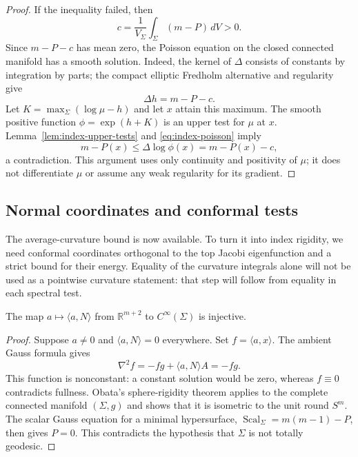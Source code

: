 \begin{proof}
If the inequality failed, then
\[
 c=\frac{1}{V_\Sigma}\int_\Sigma(m-P)\,dV>0.
\]
Since $m-P-c$ has mean zero, the Poisson equation on the closed connected
manifold has a smooth solution. Indeed, the kernel of $\Delta$ consists
of constants by integration by parts; the compact elliptic Fredholm
alternative and regularity
\cite[\S10, equations~(10.4)--(10.6)]{TaylorEllipticNotes} give
\begin{equation}\label{eq:index-poisson}
 \Delta h=m-P-c.
\end{equation}
Let $K=\max_\Sigma(\log\mu-h)$ and let $x$ attain this maximum.
The smooth positive function $\phi=\exp(h+K)$ is an upper test for $\mu$
at $x$.  Lemma~\ref{lem:index-upper-tests} and
\eqref{eq:index-poisson} imply
\[
 m-P(x)\le\Delta\log\phi(x)=m-P(x)-c,
\]
a contradiction.  This argument uses only continuity and positivity of
$\mu$; it does not differentiate $\mu$ or assume any weak regularity for
its gradient.
\end{proof}

\subsection{Normal coordinates and conformal tests}

The average-curvature bound is now available. To turn it into index
rigidity, we need conformal coordinates orthogonal to the top Jacobi
eigenfunction and a strict bound for their energy. Equality of the
curvature integrals alone will not be used as a pointwise curvature
statement: that step will follow from equality in each spectral test.

\begin{lemma}
\label{lem:index-normal-independence}
The map
$a\mapsto\langle a,N\rangle$ from $\mathbb R^{m+2}$ to
$C^\infty(\Sigma)$ is injective.
\end{lemma}

\begin{proof}
Suppose $a\ne0$ and $\langle a,N\rangle=0$ everywhere.  Set
$f=\langle a,x\rangle$.  The ambient Gauss formula gives
\[
 \nabla^2f=-fg+\langle a,N\rangle A=-fg.
\]
This function is nonconstant: a constant solution would be zero, whereas
$f\equiv0$ contradicts fullness.  Obata's sphere-rigidity theorem
\cite[Theorem~A]{Obata1962} applies to the complete connected manifold $(\Sigma,g)$
and shows that it is isometric to the unit round $S^m$.  The scalar Gauss
equation for a minimal hypersurface,
$\operatorname{Scal}_\Sigma=m(m-1)-P$, then gives $P=0$.  This contradicts
the hypothesis that $\Sigma$ is not totally geodesic.
\end{proof}

